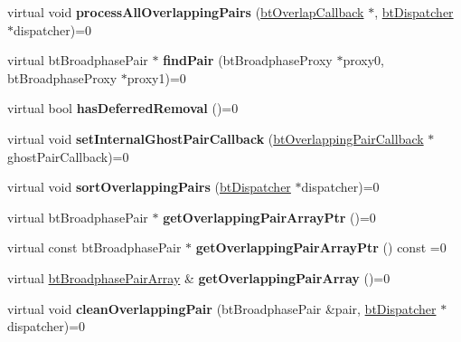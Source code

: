 \begin{DoxyCompactItemize}
virtual void {\bfseries process\+All\+Overlapping\+Pairs} (\hyperlink{structbtOverlapCallback}{bt\+Overlap\+Callback} $\ast$, \hyperlink{classbtDispatcher}{bt\+Dispatcher} $\ast$dispatcher)=0
\item 
\mbox{\label{classbtOverlappingPairCache_ac1054ce61178f557462e8d3840752d08}} 
virtual bt\+Broadphase\+Pair $\ast$ {\bfseries find\+Pair} (bt\+Broadphase\+Proxy $\ast$proxy0, bt\+Broadphase\+Proxy $\ast$proxy1)=0
\item 
\mbox{\label{classbtOverlappingPairCache_aec4b6f27f7a6f6ef39ff4e37cf3f4514}} 
virtual bool {\bfseries has\+Deferred\+Removal} ()=0
\item 
\mbox{\label{classbtOverlappingPairCache_ae6e64aa73906582205655edb1de9b4d5}} 
virtual void {\bfseries set\+Internal\+Ghost\+Pair\+Callback} (\hyperlink{classbtOverlappingPairCallback}{bt\+Overlapping\+Pair\+Callback} $\ast$ghost\+Pair\+Callback)=0
\item 
\mbox{\label{classbtOverlappingPairCache_ac1d730243d65b184d3e9a5f0c8bc5f00}} 
virtual void {\bfseries sort\+Overlapping\+Pairs} (\hyperlink{classbtDispatcher}{bt\+Dispatcher} $\ast$dispatcher)=0
\item 
\mbox{\label{classbtOverlappingPairCache_a86f4b7575c0af1b378de5bd31fdaa0a2}} 
virtual bt\+Broadphase\+Pair $\ast$ {\bfseries get\+Overlapping\+Pair\+Array\+Ptr} ()=0
\item 
\mbox{\label{classbtOverlappingPairCache_a87c26afd7caa9a824ed3729465bde1c2}} 
virtual const bt\+Broadphase\+Pair $\ast$ {\bfseries get\+Overlapping\+Pair\+Array\+Ptr} () const =0
\item 
\mbox{\label{classbtOverlappingPairCache_af1df94277b6d316b63dc0f52ac672c69}} 
virtual \hyperlink{classbtAlignedObjectArray}{bt\+Broadphase\+Pair\+Array} \& {\bfseries get\+Overlapping\+Pair\+Array} ()=0
\item 
\mbox{\label{classbtOverlappingPairCache_ab0f4a8fc8c59108b5009d0a8b1f59cf5}} 
virtual void {\bfseries clean\+Overlapping\+Pair} (bt\+Broadphase\+Pair \&pair, \hyperlink{classbtDispatcher}{bt\+Dispatcher} $\ast$dispatcher)=0

\end{DoxyCompactItemize}
